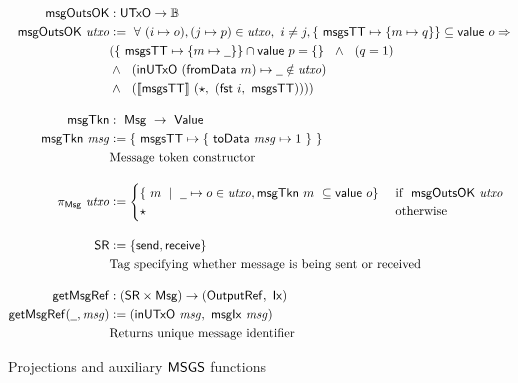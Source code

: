 \begin{figure}
  \begin{align*}
    \fun{msgOutsOK} &: \UTxO \to \B \\
    \fun{msgOutsOK}~\var{utxo} &\leteq~\forall~(i\mapsto o), (j \mapsto p) \in \var{utxo}, ~i \neq j,
    \{~\msgsTT \mapsto \{ m \mapsto q \}\} \subseteq \val~ o \Rightarrow \\
    & (\{~\msgsTT \mapsto \{ m \mapsto \wcard \}\}  \cap \val~p = \{\} ~~\wedge~~(q = 1) ~~\\
    & \wedge~~(\fun{inUTxO}~(\fun{fromData}~m) \mapsto \wcard \notin \var{utxo}) ~~ \\
    & \wedge~~(\applyMPScript{\msgsTT}~(\emptytype,~(\fun{fst}~i,~\msgsTT))))
    \nextdef
    \msgTkn &:~\Msg~\to~\Value \\
    \msgTkn ~\var{msg} &\leteq \{ ~\msgsTT \mapsto \{~\fun{toData}~\var{msg} \mapsto 1~\}~\} \\
    & \text{Message token constructor}
    \nextdef
    \pi_{\Msg}~\var{utxo} &\leteq \begin{cases}
      \{~m~\mid~\wcard\mapsto o \in \var{utxo}, \msgTkn~m~ \subseteq \val~o \} & \text{ if } ~\fun{msgOutsOK}~\var{utxo} \\
      \emptytype & \text{ otherwise }
  \end{cases}
    \nextdef
    \SR &\leteq \{\send, \receive\} \\
    & \text{Tag specifying whether message is being sent or received}
    \nextdef
    \fun{getMsgRef} &: (\SR \times \Msg) \to (\OutputRef,~\Ix) \\
    \fun{getMsgRef} (\wcard, \var{msg}) &\leteq (\fun{inUTxO}~\var{msg},~\fun{msgIx}~\var{msg}) \\
    & \text{Returns unique message identifier}
  \end{align*}
\caption{Projections and auxiliary $\mathsf{MSGS}$ functions}
\label{fig:msgs-aux}
\end{figure}

